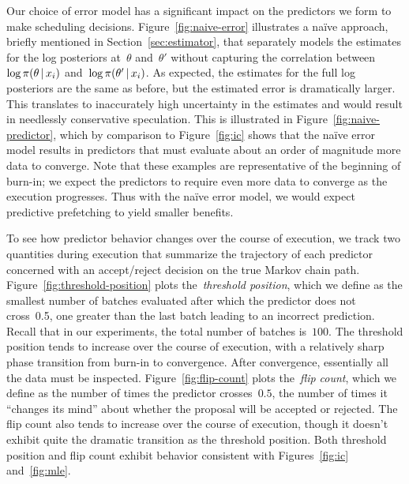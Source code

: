 \documentclass[angelino.tex]{subfiles}
\begin{document}
Our choice of error model has a significant impact on the predictors we form
to make scheduling decisions.
Figure~\ref{fig:naive-error} illustrates a na\"ive approach, briefly mentioned in 
Section~\ref{sec:estimator}, that separately models the estimates for the
log posteriors at~$\theta$ and~$\theta'$ without capturing the correlation
between~$\log \pi(\theta \,|\, x_i)$ and~$\log \pi(\theta' \,|\, x_i)$.
As expected, the estimates for the full log posteriors are the same as before,
but the estimated error is dramatically larger.
This translates to inaccurately high uncertainty in the estimates
and would result in needlessly conservative speculation.
This is illustrated in Figure~\ref{fig:naive-predictor}, which by comparison to
Figure~\ref{fig:ic} shows that the na\"ive error model results in predictors
that must evaluate about an order of magnitude more data to converge.
Note that these examples are representative of the beginning of burn-in;
we expect the predictors to require even more data to converge as the
execution progresses.
Thus with the na\"ive error model, we would expect predictive prefetching to
yield smaller benefits.

To see how predictor behavior changes over the course of execution, we track
two quantities during execution that summarize the trajectory of each predictor
concerned with an accept/reject decision on the true Markov chain path.
%
Figure~\ref{fig:threshold-position} plots the~\emph{threshold position},
which we define as the smallest number of batches evaluated after which the
predictor does not cross~0.5,
\ie one greater than the last batch leading to an incorrect prediction. 
Recall that in our experiments, the total number of batches is~$100$.
The threshold position tends to increase over the course of execution,
with a relatively sharp phase transition from burn-in to convergence.
After convergence, essentially all the data must be inspected.
%
Figure~\ref{fig:flip-count} plots the~\emph{flip count}, which we define as the
number of times the predictor crosses~$0.5$, \ie the number of times it
``changes its mind'' about whether the proposal will be accepted or rejected.
The flip count also tends to increase over the course of execution,
though it doesn't exhibit quite the dramatic transition as the threshold position.
%
Both threshold position and flip count exhibit behavior consistent with
Figures~\ref{fig:ic} and~\ref{fig:mle}.
\end{document}
